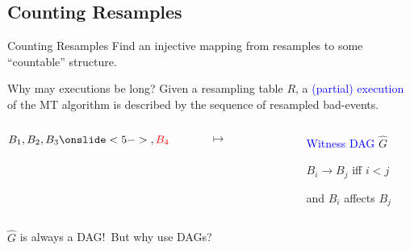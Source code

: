 \documentclass{beamer}
\def\padding{\vspace{0.5cm}}
\def\spadding{\vspace{0.25cm}}
\def\b{\textcolor{blue}}
\def\r{\textcolor{red}}
\begin{document}
    
    

\subsection{Counting Resamples}
\begin{frame}{Counting Resamples}
Find an injective mapping from resamples to some ``countable'' structure.\pause

\begin{block}{Why may executions be long?}
Given a resampling table $R$, a \b{(partial) execution} of the MT algorithm is described by the sequence of resampled bad-events.\pause\spadding

\begin{columns}
\begin{column}{.15\textwidth}
\centering $B_1, B_2, B_3\onslide<5->{, \r{B_4}}$
\end{column}
\begin{column}{.0\textwidth}
\centering $\mapsto$
\end{column}\pause
\begin{column}{.2\textwidth}
\centering
\end{column}
\begin{column}{.3\textwidth}
\b{Witness DAG} $\hat{G}$

$B_i \longrightarrow B_j$ iff $i < j$\par and $B_i$ affects $B_j$
\end{column}
\end{columns}\pause\pause

\follows $\hat{G}$ is always a DAG!\pause\ But why use DAGs?
\end{block}
\end{frame}
\end{document}
